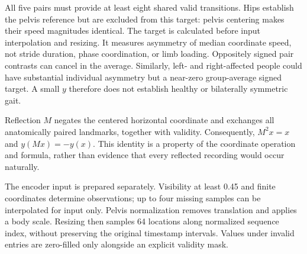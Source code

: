 \documentclass{article}
\begin{document}
All five pairs must provide at least eight shared valid transitions. Hips establish the pelvis reference but are excluded from this target: pelvis centering makes their speed magnitudes identical. The target is calculated before input interpolation and resizing. It measures asymmetry of median coordinate speed, not stride duration, phase coordination, or limb loading. Oppositely signed pair contrasts can cancel in the average. Similarly, left- and right-affected people could have substantial individual asymmetry but a near-zero group-average signed target. A small \(y\) therefore does not establish healthy or bilaterally symmetric gait.

Reflection \(M\) negates the centered horizontal coordinate and exchanges all anatomically paired landmarks, together with validity. Consequently, \(M^2x=x\) and \(y(Mx)=-y(x)\). This identity is a property of the coordinate operation and formula, rather than evidence that every reflected recording would occur naturally.

The encoder input is prepared separately. Visibility at least 0.45 and finite coordinates determine observations; up to four missing samples can be interpolated for input only. Pelvis normalization removes translation and applies a body scale. Resizing then samples 64 locations along normalized sequence index, without preserving the original timestamp intervals. Values under invalid entries are zero-filled only alongside an explicit validity mask.
\end{document}
